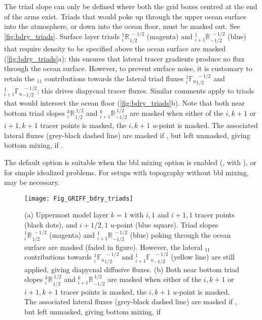 \documentclass[../main/NEMO_manual]{subfiles}
\newcommand{\triad}[6][]{\ensuremath{{}_{#2}^{#3}{\mathbb{#4}_{#1}}_{#5}^{\,#6}}}
\begin{document}
The triad slope can only be defined where both the grid boxes centred at the end of the arms exist.
Triads that would poke up through the upper ocean surface into the atmosphere,
or down into the ocean floor, must be masked out.
See \autoref{fig:bdry_triads}.
Surface layer triads \triad{i}{1}{R}{1/2}{-1/2} (magenta) and \triad{i+1}{1}{R}{-1/2}{-1/2} (blue) that
require density to be specified above the ocean surface are masked (\autoref{fig:bdry_triads}a):
this ensures that lateral tracer gradients produce no flux through the ocean surface.
However, to prevent surface noise, it is customary to retain the $_{11}$ contributions towards
the lateral triad fluxes \triad[u]{i}{1}{F}{1/2}{-1/2} and \triad[u]{i+1}{1}{F}{-1/2}{-1/2};
this drives diapycnal tracer fluxes.
Similar comments apply to triads that would intersect the ocean floor (\autoref{fig:bdry_triads}b).
Note that both near bottom triad slopes \triad{i}{k}{R}{1/2}{1/2} and \triad{i+1}{k}{R}{-1/2}{1/2} are masked when
either of the $i,k+1$ or $i+1,k+1$ tracer points is masked, \ie the $i,k+1$ $u$-point is masked.
The associated lateral fluxes (grey-black dashed line) are masked if ,
but left unmasked, giving bottom mixing, if .

The default option  is suitable when the bbl mixing option is enabled
(, with ), or for simple idealized problems.
For setups with topography without bbl mixing,  may be necessary.
\begin{figure}[h]
  \begin{center}
    \texttt{[image: Fig\_GRIFF\_bdry\_triads]}
    \caption{
      \protect\label{fig:bdry_triads}
      (a) Uppermost model layer $k=1$ with $i,1$ and $i+1,1$ tracer points (black dots),
      and $i+1/2,1$ $u$-point (blue square).
      Triad slopes \triad{i}{1}{R}{1/2}{-1/2} (magenta) and \triad{i+1}{1}{R}{-1/2}{-1/2} (blue) poking through
      the ocean surface are masked (faded in figure).
      However, the lateral $_{11}$ contributions towards \triad[u]{i}{1}{F}{1/2}{-1/2} and
      \triad[u]{i+1}{1}{F}{-1/2}{-1/2} (yellow line) are still applied,
      giving diapycnal diffusive fluxes.
      \newline
      (b) Both near bottom triad slopes \triad{i}{k}{R}{1/2}{1/2} and
      \triad{i+1}{k}{R}{-1/2}{1/2} are masked when either of the $i,k+1$ or $i+1,k+1$ tracer points is masked,
      \ie the $i,k+1$ $u$-point is masked.
      The associated lateral fluxes (grey-black dashed line) are masked if
      \protect{}, but left unmasked,
      giving bottom mixing, if \protect{}
    }
  \end{center}
\end{figure}
\end{document}
